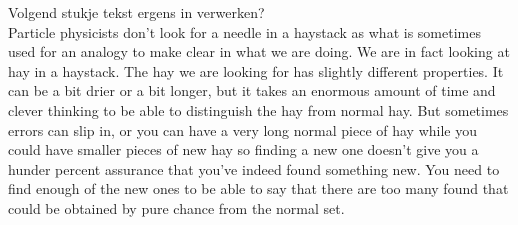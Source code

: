 Volgend stukje tekst ergens in verwerken?\\
\noindent Particle physicists don't look for a needle in a haystack as what is sometimes used for an analogy to make clear in what we are doing. We are in fact looking at hay in a haystack. The hay we are looking for has slightly different properties. It can be a bit drier or a bit longer, but it takes an enormous amount of time and clever thinking to be able to distinguish the hay from normal hay. But sometimes errors can slip in, or you can have a very long normal piece of hay while you could have smaller pieces of new hay so finding a new one doesn't give you a hunder percent assurance that you've indeed found something new. You need to find enough of the new ones to be able to say that there are too many found that could be obtained by pure chance from the normal set.